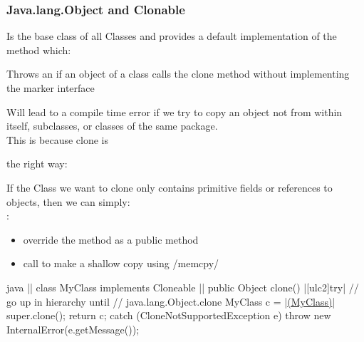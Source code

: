 \subsubsection{Java.lang.Object and Clonable}
\begin{defnbox}\nospacing
  \begin{defn}\label{defn:}
    Is the base class of all Classes and provides a 
    default implementation of the  method which:
    \begin{itemizenosep}
      \item Throws an 
      if an object of a class calls the clone method without
      implementing the  marker interface
      \item Will lead to a compile time error if we try to copy an object
      not from within itself, subclasses, or classes of the same package.\\
      This is because clone is 
    \end{itemizenosep}
  \end{defn}
\end{defnbox}
\begin{defnbox}\nospacing
     the right way:
    \begin{itemizenosep}
        \item If the Class we want to clone only contains primitive fields or
      references to  objects, then we can simply:\\
      :
      \begin{itemize}
          \item override the  method as a public method
          \item call  to make a shallow copy using \cppinline/memcpy/
      \end{itemize}
      \begin{mintlinebox}{java}
        || class MyClass implements Cloneable{
          |\optldots|
          public Object clone(){
            |\ul[ulc2]{try}|{
              // go up in hierarchy until
              // java.lang.Object.clone
              MyClass c = |\ul{(MyClass)}| super.clone();
              return c;
            } catch (CloneNotSupportedException e){
              throw new InternalError(e.getMessage());
            }
          }
        }
      \end{mintlinebox}
    \end{itemizenosep}
\end{defnbox}
